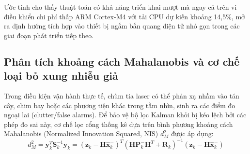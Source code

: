 \begin{table}[H]
\centering
\caption{Ước tính thời gian thực thi chuỗi thuật toán trên các nền tảng phần cứng nhúng}
\label{tab:embedded-hardware-performance}
\end{table}

Ước tính cho thấy thuật toán có khả năng triển khai mượt mà ngay cả trên vi điều khiển chi phí thấp ARM Cortex-M4 với tải CPU dự kiến khoảng 14,5\%, mở ra định hướng tích hợp vào thiết bị ngắm bắn quang điện tử nhỏ gọn trong các giai đoạn phát triển tiếp theo.

\subsection{Phân tích khoảng cách Mahalanobis và cơ chế loại bỏ xung nhiễu giả}

\hspace{0.5cm} Trong điều kiện vận hành thực tế, chùm tia laser có thể phản xạ nhầm vào tán cây, chim bay hoặc các phương tiện khác trong tầm nhìn, sinh ra các điểm đo ngoại lai (clutter/false alarms). Để bảo vệ bộ lọc Kalman khỏi bị kéo lệch bởi các phép đo sai này, cơ chế lọc cổng thống kê dựa trên bình phương khoảng cách Mahalanobis (Normalized Innovation Squared, NIS) $d_M^2$ được áp dụng:
\begin{equation}
d_M^2 = \mathbf{y}_k^T \mathbf{S}_k^{-1} \mathbf{y}_k = (\mathbf{z}_k - \mathbf{H}\hat{\mathbf{x}}_k^-)^T (\mathbf{H}\mathbf{P}_k^-\mathbf{H}^T + \mathbf{R}_k)^{-1} (\mathbf{z}_k - \mathbf{H}\hat{\mathbf{x}}_k^-)
\label{eq:mahalanobis-distance}
\end{equation}

